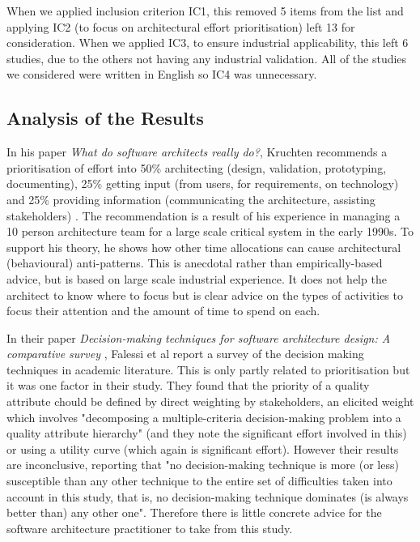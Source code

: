 When we applied inclusion criterion IC1, this removed 5 items from the list and applying IC2 (to focus on architectural effort prioritisation) left 13 for consideration.  When we applied IC3, to ensure industrial applicability, this left 6 studies, due to the others not having any industrial validation.  All of the studies we considered were written in English so IC4 was unnecessary.

\subsection{Analysis of the Results}

In his paper \emph{What do software architects really do?}, Kruchten recommends a prioritisation of effort into 50\% architecting (design, validation, prototyping, documenting), 25\% getting input (from users, for requirements, on technology) and 25\% providing information (communicating the architecture, assisting stakeholders) \cite{kruchten2008-architectsdo}. The recommendation is a result of his experience in managing a 10 person architecture team for a large scale critical system in the early 1990s.  To support his theory, he shows how other time allocations can cause architectural (behavioural) anti-patterns.  This is anecdotal rather than empirically-based advice, but is based on large scale industrial experience.  It does not help the architect to know where to focus but is clear advice on the types of activities to focus their attention and the amount of time to spend on each.

In their paper \emph{Decision-making techniques for software architecture design: A comparative survey} \cite{falessi2011-archdecisionsurvey}, Falessi et al report a survey of the decision making techniques in academic literature.  This is only partly related to prioritisation but it was one factor in their study.  They found that the priority of a quality attribute chould be defined by direct weighting by stakeholders, an elicited weight which involves "decomposing a multiple-criteria decision-making problem into a quality attribute hierarchy" (and they note the significant effort involved in this) or using a utility curve (which again is significant effort).  However their results are inconclusive, reporting that "no decision-making technique is more (or less) susceptible than any other technique to the entire set of difficulties taken into account in this study, that is, no decision-making technique dominates (is always better than) any other one".  Therefore there is little concrete advice for the software architecture practitioner to take from this study.

